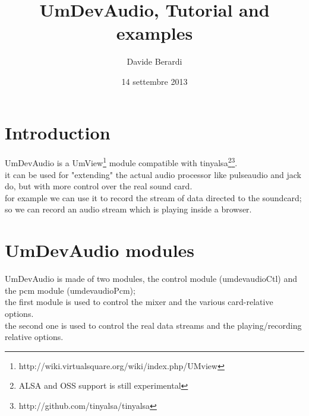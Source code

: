 \documentclass[a4paper,12pt]{article}
\title{UmDevAudio, Tutorial and examples}
\author{Davide Berardi}
\date{14 settembre 2013}
\begin{document}
	\maketitle
	\section{Introduction}
	UmDevAudio is a UmView\footnote{http://wiki.virtualsquare.org/wiki/index.php/UMview} module compatible with tinyalsa\footnote{ALSA and OSS support is still experimental}\footnote{http://github.com/tinyalsa/tinyalsa}.\\
	it can be used for "extending" the actual audio processor like pulseaudio and jack do, but with more control over the real sound card.\\
	for example we can use it to record the stream of data directed to the soundcard;
	so we can record an audio stream which is playing inside a browser.\\
	\section{UmDevAudio modules}
	UmDevAudio is made of two modules, the control module (umdevaudioCtl) and the pcm module (umdevaudioPcm);\\
	the first module is used to control the mixer and the various card-relative options.\\
	the second one is used to control the real data streams and the playing/recording relative options.\\
\end{document}
